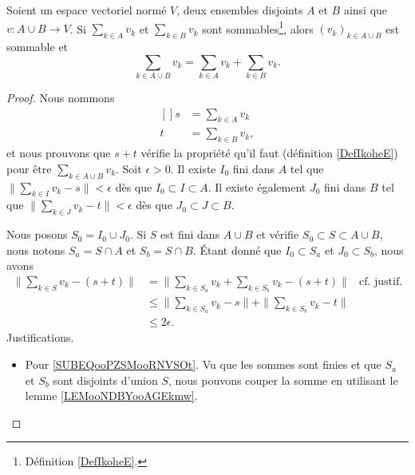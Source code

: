 \begin{proposition}      \label{PROPooJLQAooAEbIvZ}
	Soient un espace vectoriel normé \( V\), deux ensembles disjoints \( A\) et \( B\) ainsi que \( v\colon A\cup B\to V\). Si \( \sum_{k\in A}v_k\) et \( \sum_{k\in B}v_k\) sont sommables\footnote{Définition \ref{DefIkoheE}.}, alors \( (v_k)_{k\in A\cup B}\) est sommable et
	\begin{equation}
		\sum_{k\in A\cup B}v_k=\sum_{k\in A}v_k+\sum_{k\in B}v_k.
	\end{equation}
\end{proposition}

\begin{proof}
	Nous nommons
	\begin{equation}
		\begin{aligned}[]
			s & =\sum_{k\in A}v_k  \\
			t & =\sum_{k\in B}v_k,
		\end{aligned}
	\end{equation}
	et nous prouvons que \( s+t\) vérifie la propriété qu'il faut (définition \ref{DefIkoheE}) pour être \( \sum_{k\in A\cup B}v_k\). Soit \( \epsilon>0\). Il existe \( I_0\) fini dans \( A\) tel que \( \| \sum_{k\in I}v_k-s \|<\epsilon\) dès que \( I_0\subset I\subset A\). Il existe également \( J_0\) fini dans \( B\) tel que \( \| \sum_{k\in J}v_k-t \|<\epsilon\) dès que \( J_0\subset J\subset B\).

	Nous posons \( S_0=I_0\cup J_0\). Si \( S\) est fini dans \( A\cup B\) et vérifie \( S_0\subset S\subset A\cup B\), nous notons \( S_a=S\cap A\) et \( S_b=S\cap B\). Étant donné que \( I_0\subset S_a\) et \( J_0\subset S_b\), nous avons
	\begin{subequations}
		\begin{align}
			\| \sum_{k\in S}v_k-(s+t) \| & =\| \sum_{k\in S_a}v_k+\sum_{k\in S_b}v_k-(s+t) \|         & \text{cf. justif.} 	\label{SUBEQooPZSMooRNVSOt} \\
			                             & \leq \| \sum_{k\in S_a}v_k-s \|+\| \sum_{k\in S_b}v_k-t \|                                                  \\
			                             & \leq 2\epsilon.
		\end{align}
	\end{subequations}
	Justifications.
	\begin{itemize}
		\item
		      Pour \ref{SUBEQooPZSMooRNVSOt}. Vu que les sommes sont finies et que \( S_a\) et \( S_b\) sont disjoints d'union \( S\), nous pouvons couper la somme en utilisant le lemme \ref{LEMooNDBYooAGEkmw}.
	\end{itemize}
\end{proof}

